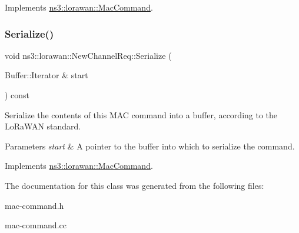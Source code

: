 Implements \hyperlink{classns3_1_1lorawan_1_1MacCommand_a6bf88db38dab7dcd817811a9fb59f920}{ns3\+::lorawan\+::\+Mac\+Command}.

\mbox{\label{classns3_1_1lorawan_1_1NewChannelReq_aa61501c0d31796aea70b93b011b3a0ee}} 
\subsubsection{\texorpdfstring{Serialize()}{Serialize()}}
{\footnotesize\ttfamily void ns3\+::lorawan\+::\+New\+Channel\+Req\+::\+Serialize (\begin{DoxyParamCaption}\item[{Buffer\+::\+Iterator \&}]{start }\end{DoxyParamCaption}) const\hspace{0.3cm}{\ttfamily [virtual]}}

Serialize the contents of this M\+AC command into a buffer, according to the Lo\+Ra\+W\+AN standard.


\begin{DoxyParams}{Parameters}
{\em start} & A pointer to the buffer into which to serialize the command. \\
\hline
\end{DoxyParams}


Implements \hyperlink{classns3_1_1lorawan_1_1MacCommand_a0ed44b33942ddc3dc9694dc06ab0b87f}{ns3\+::lorawan\+::\+Mac\+Command}.



The documentation for this class was generated from the following files\+:\begin{DoxyCompactItemize}
\item 
mac-\/command.\+h\item 
mac-\/command.\+cc\end{DoxyCompactItemize}
